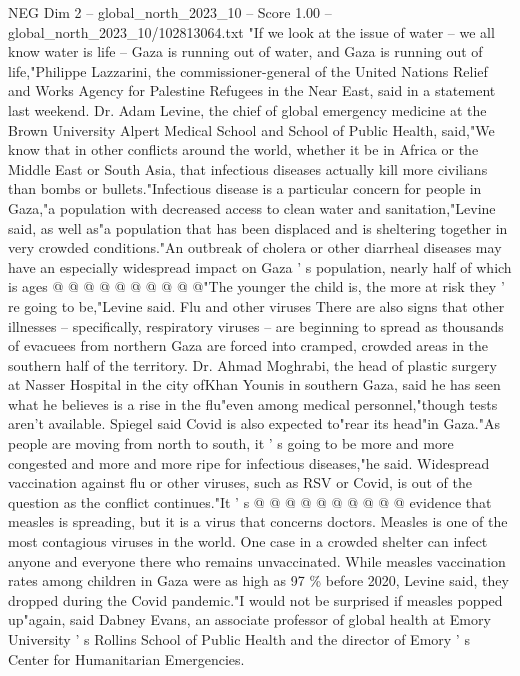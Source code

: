 \begin{textsample}{NEG Dim 2 – global\_north\_2023\_10 – Score 1.00 – global\_north\_2023\_10/102813064.txt}  \label{ex:f2_neg_302}
"If we look at the issue of water -- we all know water is life -- Gaza is running out of water, and Gaza is running out of life,"Philippe Lazzarini, the commissioner-general of the United Nations Relief and Works Agency for Palestine Refugees in the Near East, said in a statement last weekend.
Dr.
Adam Levine, the chief of global emergency medicine at the Brown University Alpert Medical School and School of Public Health, said,"We know that in other conflicts around the world, whether it be in Africa or the Middle East or South Asia, that infectious diseases actually kill more civilians than bombs or bullets."Infectious disease is a particular concern for people in Gaza,"a population with decreased access to clean water and sanitation,"Levine said, as well as"a population that has been displaced and is sheltering together in very crowded conditions."An outbreak of cholera or other diarrheal diseases may have an especially widespread impact on Gaza ' s population, nearly half of which is ages @ @ @ @ @ @ @ @ @ @"The younger the child is, the more at risk they ' re going to be,"Levine said.
Flu and other viruses There are also signs that other illnesses -- specifically, respiratory viruses -- are beginning to spread as thousands of evacuees from northern Gaza are forced into cramped, crowded areas in the southern half of the territory.
Dr.
Ahmad Moghrabi, the head of plastic surgery at Nasser Hospital in the city ofKhan Younis in southern Gaza, said he has seen what he believes is a rise in the flu"even among medical personnel,"though tests aren't available.
Spiegel said Covid is also expected to"rear its head"in Gaza."As people are moving from north to south, it ' s going to be more and more congested and more and more ripe for infectious diseases,"he said.
Widespread vaccination against flu or other viruses, such as RSV or Covid, is out of the question as the conflict continues."It ' s @ @ @ @ @ @ @ @ @ @ evidence that measles is spreading, but it is a virus that concerns doctors.
Measles is one of the most contagious viruses in the world.
One case in a crowded shelter can infect anyone and everyone there who remains unvaccinated.
While measles vaccination rates among children in Gaza were as high as 97 \% before 2020, Levine said, they dropped during the Covid pandemic."I would not be surprised if measles popped up"again, said Dabney Evans, an associate professor of global health at Emory University ' s Rollins School of Public Health and the director of Emory ' s Center for Humanitarian Emergencies.

\end{textsample}
